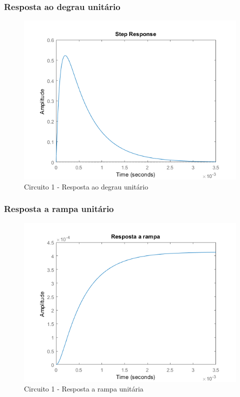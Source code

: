 \documentclass[a4paper, 12pt]{article}
\begin{document}
			\subsubsection{Resposta ao degrau unitário}
			\begin{figure}[!ht]
				\centering
				\includegraphics[scale=0.71]{img/1g_circ1.png}
				\caption{Circuito 1 - Resposta ao degrau unitário}	
			\end{figure}					
			\subsubsection{Resposta a rampa unitário}
			\begin{figure}[!ht]
				\centering
				\includegraphics[scale=0.72]{img/1h_circ1.png}
				\caption{Circuito 1 - Resposta a rampa unitária}	
			\end{figure}		
\end{document}
